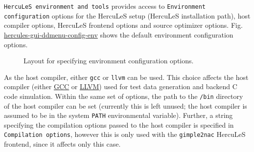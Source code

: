 \documentclass[a4paper]{article}
\begin{document}
\texttt{HercuLeS environment and tools} provides access to \texttt{Environment configuration} options for the HercuLeS setup (HercuLeS installation path), host compiler options, HercuLeS frontend options and source optimizer options. Fig. \hyperref[hercules-gui-ddmenu-config-env]{hercules-gui-ddmenu-config-env} shows the default environment configuration options.
\begin{figure}
\label{hercules-gui-ddmenu-config-env}
\noindent{}
\caption{Layout for specifying environment configuration options.}
\end{figure}

As the host compiler, either \texttt{gcc} or \texttt{llvm} can be used. This choice affects the host compiler (either \href{http://gcc.gnu.org}{GCC} or \href{http://llvm.org}{LLVM}) used for test data generation and backend C code simulation. Within the same set of options, the path to the \texttt{/bin} directory of the host compiler can be set (currently this is left unused; the host compiler is assumed to be in the system \texttt{PATH} environmental variable). Further, a string specifying the compilation options passed to the host compiler is specified in \texttt{Compilation options}, however this is only used with the \texttt{gimple2nac} HercuLeS frontend, since it affects only this case.
\end{document}
